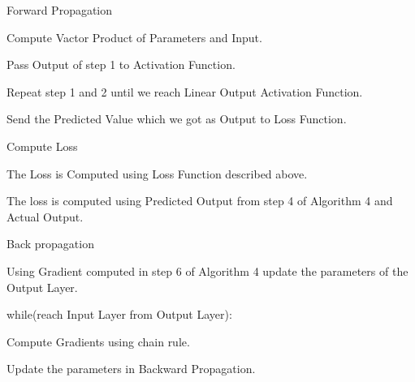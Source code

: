 \begin{itemize}
\begin{algorithm}[H]
\end{algorithm}


\begin{algorithm}[H]

\caption{Forward Propagation}

\begin{algorithmic}[1] 
						
\STATE Compute Vactor Product of Parameters and Input.

\STATE Pass Output of step 1 to Activation Function.

\STATE Repeat step 1 and 2 until we reach Linear Output Activation Function.

\STATE Send the Predicted Value which we got as Output to Loss Function.

\end{algorithmic}

\end{algorithm}

\begin{algorithm}[H]

\caption{Compute Loss}

\begin{algorithmic}[1] 
						
\STATE The Loss is Computed using Loss Function described above.

\STATE The loss is computed using Predicted Output from step 4 of Algorithm 4 and Actual Output.

\end{algorithmic}

\end{algorithm}

\begin{algorithm}[H]

\caption{Back propagation}

\begin{algorithmic}[1] 
						
\STATE Using Gradient computed in step 6 of Algorithm 4 update the parameters of the Output Layer.

\STATE while(reach Input Layer from Output Layer):

\STATE \tab Compute Gradients using chain rule.

\STATE \tab Update the parameters in Backward Propagation.

\end{algorithmic}

\end{algorithm}



\end{itemize}

